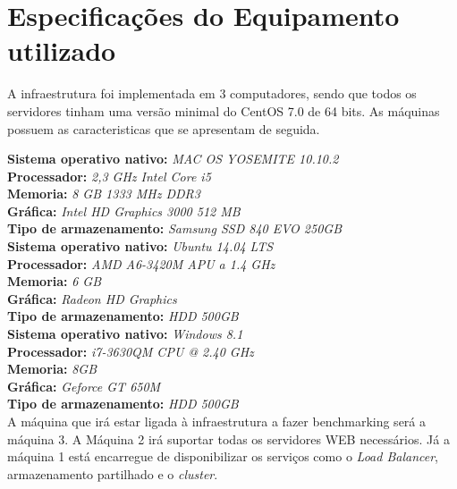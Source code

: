 \section{Especificações do Equipamento utilizado}

A infraestrutura foi implementada em 3 computadores, sendo que todos os servidores tinham uma versão minimal do CentOS 7.0 de 64 bits. As máquinas possuem as caracteristicas que se apresentam de seguida.

\textbf{Sistema operativo nativo:} \textit{MAC OS YOSEMITE 10.10.2} \\
\textbf{Processador:} \textit{2,3 GHz Intel Core i5} \\
\textbf{Memoria:} \textit{8 GB 1333 MHz DDR3} \\
\textbf{Gráfica:} \textit{Intel HD Graphics 3000 512 MB} \\
\textbf{Tipo de armazenamento:} \textit{Samsung SSD 840 EVO 250GB} \\

\textbf{Sistema operativo nativo:} \textit{Ubuntu 14.04 LTS} \\
\textbf{Processador:} \textit{AMD A6-3420M APU a 1.4 GHz} \\
\textbf{Memoria:} \textit{6 GB} \\
\textbf{Gráfica:} \textit{Radeon HD Graphics} \\
\textbf{Tipo de armazenamento:} \textit{HDD 500GB} \\

\textbf{Sistema operativo nativo:} \textit{Windows 8.1} \\
\textbf{Processador:} \textit{i7-3630QM CPU @ 2.40 GHz} \\
\textbf{Memoria:} \textit{8GB} \\
\textbf{Gráfica:} \textit{Geforce GT 650M} \\
\textbf{Tipo de armazenamento:} \textit{HDD 500GB} \\

A máquina que irá estar ligada à infraestrutura a fazer benchmarking será a máquina 3. A Máquina 2 irá suportar todas os servidores WEB necessários. Já a máquina 1 está encarregue de disponibilizar os serviços como o \textit{Load Balancer}, armazenamento partilhado e o \textit{cluster}.
